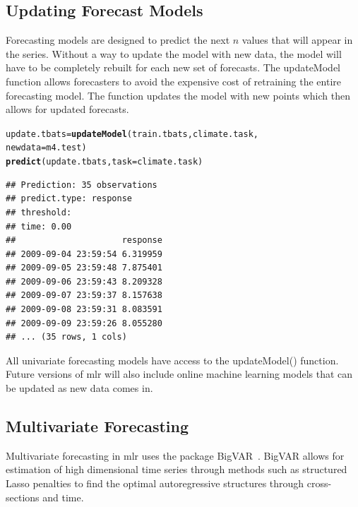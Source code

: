 \documentclass[12pt]{article}\usepackage[]{graphicx}\usepackage[]{color}
\makeatletter
\newcommand{\hlstd}[1]{\textcolor[rgb]{0.345,0.345,0.345}{#1}}%
\newcommand{\hlkwb}[1]{\textcolor[rgb]{0.69,0.353,0.396}{#1}}%
\newcommand{\hlkwc}[1]{\textcolor[rgb]{0.333,0.667,0.333}{#1}}%
\newcommand{\hlkwd}[1]{\textcolor[rgb]{0.737,0.353,0.396}{\textbf{#1}}}%
\newenvironment{kframe}{%
 \def\at@end@of@kframe{}%
 \ifinner\ifhmode%
  \def\at@end@of@kframe{\end{minipage}}%
  \begin{minipage}{\columnwidth}%
 \fi\fi%
 \def\FrameCommand##1{\hskip\@totalleftmargin \hskip-\fboxsep
 \colorbox{shadecolor}{##1}\hskip-\fboxsep
     \hskip-\linewidth \hskip-\@totalleftmargin \hskip\columnwidth}%
 \MakeFramed {\advance\hsize-\width
   \@totalleftmargin\z@ \linewidth\hsize
   \@setminipage}}%
 {\par\unskip\endMakeFramed%
 \at@end@of@kframe}
\newenvironment{knitrout}{}{} %
\theoremstyle{definition}
\newcommand\code{\@codex}
\def\@codex#1{{\normalfont\ttfamily\hyphenchar\font=-1 #1}}
\newcommand{\pkg}[1]{{\fontseries{b}\selectfont #1}}
\makeatother
\begin{document}
\subsection{Updating Forecast Models}

 Forecasting models are designed to predict the next $n$ values that will appear in the series. Without a way to update the model with new data, the model will have to be completely rebuilt for each new set of forecasts. The \code{updateModel} function allows forecasters to avoid the expensive cost of retraining the entire forecasting model. The function updates the model with new points which then allows for updated forecasts. 

\singlespacing
\begin{knitrout}
\color{fgcolor}\begin{kframe}
\begin{alltt}
\hlstd{update.tbats} \hlkwb{=} \hlkwd{updateModel}\hlstd{(train.tbats, climate.task,}
                           \hlkwc{newdata} \hlstd{= m4.test)}
\hlkwd{predict}\hlstd{(update.tbats,} \hlkwc{task} \hlstd{= climate.task)}
\end{alltt}
\begin{verbatim}
## Prediction: 35 observations
## predict.type: response
## threshold: 
## time: 0.00
##                     response
## 2009-09-04 23:59:54 6.319959
## 2009-09-05 23:59:48 7.875401
## 2009-09-06 23:59:43 8.209328
## 2009-09-07 23:59:37 8.157638
## 2009-09-08 23:59:31 8.083591
## 2009-09-09 23:59:26 8.055280
## ... (35 rows, 1 cols)
\end{verbatim}
\end{kframe}
\end{knitrout}
\doublespacing

All univariate forecasting models have access to the \code{updateModel()} function. Future versions of \code{mlr} will also include online machine learning models that can be updated as new data comes in.

\subsection{Multivariate Forecasting}
\label{seq:buildAndTuneMulti}

Multivariate forecasting in \pkg{mlr} uses the package \pkg{BigVAR}~\cite{bigvarpaper}. \pkg{BigVAR} allows for estimation of high dimensional time series through methods such as structured Lasso penalties to find the optimal autoregressive structures through cross-sections and time.
\end{document}

